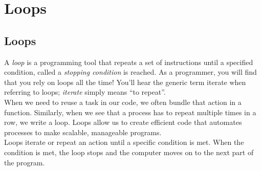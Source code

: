 \documentclass[11pt]{article}
\begin{document}
\newpage
\section{Loops}
\subsection{Loops}
A \textit{loop} is a programming tool that repeats a set of instructions until a specified condition, called a \textit{stopping condition} is reached. As a programmer, you will find that you rely on loops all the time! You’ll hear the generic term iterate when referring to loops; \textit{iterate} simply means “to repeat”. \\
\newline
When we need to reuse a task in our code, we often bundle that action in a function. Similarly, when we see that a process has to repeat multiple times in a row, we write a loop. Loops allow us to create efficient code that automates processes to make scalable, manageable programs. \\
\newline
Loops iterate or repeat an action until a specific condition is met. When the condition is met, the loop stops and the computer moves on to the next part of the program.
\end{document}
